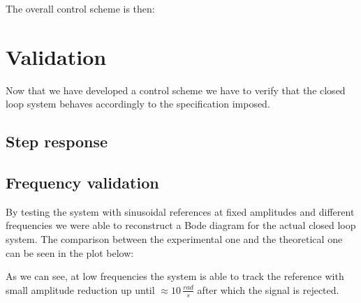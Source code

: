 The overall control scheme is then:


\section{Validation}

Now that we have developed a control scheme we have to verify that the closed loop system behaves accordingly to the specification imposed. 

\subsection{Step response}

\subsection{Frequency validation}

By testing the system with sinusoidal references at fixed amplitudes and different frequencies we were able to reconstruct a Bode diagram for the actual closed loop system. The comparison between the experimental one and the theoretical one can be seen in the plot below:


As we can see, at low frequencies the system is able to track the reference with small amplitude reduction up until $\approx 10 \, \frac{rad}{s}$ after which the signal is rejected.